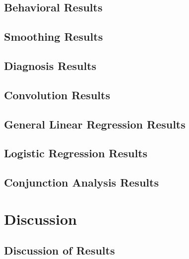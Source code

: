 \documentclass[11pt]{article}
\begin{document}
    \subsection{Behavioral Results}
            
    \subsection{Smoothing Results}
            
    \subsection{Diagnosis Results}
            
    \subsection{Convolution Results}
            
    \subsection{General Linear Regression Results}
            
    \subsection{Logistic Regression Results}
            
    \subsection{Conjunction Analysis Results}
            

\section{Discussion}

    \subsection{Discussion of Results}
            


\end{document}
